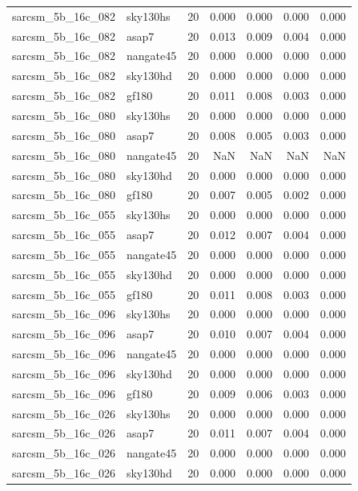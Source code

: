\begin{tabular}{llrrrrr}
sarcsm\_5b\_16c\_082 & sky130hs & 20 & 0.000 & 0.000 & 0.000 & 0.000 \\
sarcsm\_5b\_16c\_082 & asap7 & 20 & 0.013 & 0.009 & 0.004 & 0.000 \\
sarcsm\_5b\_16c\_082 & nangate45 & 20 & 0.000 & 0.000 & 0.000 & 0.000 \\
sarcsm\_5b\_16c\_082 & sky130hd & 20 & 0.000 & 0.000 & 0.000 & 0.000 \\
sarcsm\_5b\_16c\_082 & gf180 & 20 & 0.011 & 0.008 & 0.003 & 0.000 \\
sarcsm\_5b\_16c\_080 & sky130hs & 20 & 0.000 & 0.000 & 0.000 & 0.000 \\
sarcsm\_5b\_16c\_080 & asap7 & 20 & 0.008 & 0.005 & 0.003 & 0.000 \\
sarcsm\_5b\_16c\_080 & nangate45 & 20 & NaN & NaN & NaN & NaN \\
sarcsm\_5b\_16c\_080 & sky130hd & 20 & 0.000 & 0.000 & 0.000 & 0.000 \\
sarcsm\_5b\_16c\_080 & gf180 & 20 & 0.007 & 0.005 & 0.002 & 0.000 \\
sarcsm\_5b\_16c\_055 & sky130hs & 20 & 0.000 & 0.000 & 0.000 & 0.000 \\
sarcsm\_5b\_16c\_055 & asap7 & 20 & 0.012 & 0.007 & 0.004 & 0.000 \\
sarcsm\_5b\_16c\_055 & nangate45 & 20 & 0.000 & 0.000 & 0.000 & 0.000 \\
sarcsm\_5b\_16c\_055 & sky130hd & 20 & 0.000 & 0.000 & 0.000 & 0.000 \\
sarcsm\_5b\_16c\_055 & gf180 & 20 & 0.011 & 0.008 & 0.003 & 0.000 \\
sarcsm\_5b\_16c\_096 & sky130hs & 20 & 0.000 & 0.000 & 0.000 & 0.000 \\
sarcsm\_5b\_16c\_096 & asap7 & 20 & 0.010 & 0.007 & 0.004 & 0.000 \\
sarcsm\_5b\_16c\_096 & nangate45 & 20 & 0.000 & 0.000 & 0.000 & 0.000 \\
sarcsm\_5b\_16c\_096 & sky130hd & 20 & 0.000 & 0.000 & 0.000 & 0.000 \\
sarcsm\_5b\_16c\_096 & gf180 & 20 & 0.009 & 0.006 & 0.003 & 0.000 \\
sarcsm\_5b\_16c\_026 & sky130hs & 20 & 0.000 & 0.000 & 0.000 & 0.000 \\
sarcsm\_5b\_16c\_026 & asap7 & 20 & 0.011 & 0.007 & 0.004 & 0.000 \\
sarcsm\_5b\_16c\_026 & nangate45 & 20 & 0.000 & 0.000 & 0.000 & 0.000 \\
sarcsm\_5b\_16c\_026 & sky130hd & 20 & 0.000 & 0.000 & 0.000 & 0.000 \\

\end{tabular}
